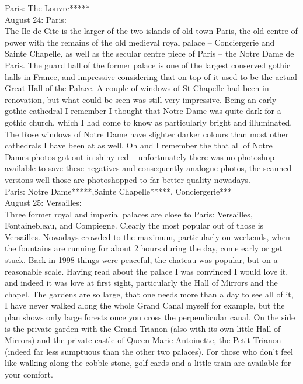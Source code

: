 Paris: The Louvre*****\\

August 24: Paris:\\
The Ile de Cite is the larger of the two islands of old town Paris, the old centre of power with the remains of the old medieval royal palace -- Conciergerie and Sainte Chapelle, as well as the secular centre piece of Paris -- the Notre Dame de Paris. The guard hall of the former palace is one of the largest conserved gothic halls in France, and impressive considering that on top of it used to be the actual Great Hall of the Palace. A couple of windows of St Chapelle had been in renovation, but what could be seen was still very impressive. Being an early gothic cathedral I remember I thought that Notre Dame was quite dark for a gothic church, which I had come to know as particularly bright and illuminated. The Rose windows of Notre Dame have slighter darker colours than most other cathedrals I have been at as well. Oh and I remember the that all of Notre Dames photos got out in shiny red -- unfortunately there was no photoshop available to save these negatives and consequently analogue photos, the scanned versions well those are photoshopped to far better quality nowadays.\\ 

Paris: Notre Dame*****,Sainte Chapelle*****, Conciergerie***\\

August 25: Versailles:\\
Three former royal and imperial palaces are close to Paris: Versailles, Fontainebleau, and Compiegne. Clearly the most popular out of those is Versailles. Nowadays crowded to the maximum, particularly on weekends, when the fountains are running for about 2 hours during the day, come early or get stuck. Back in 1998 things were peaceful, the chateau was popular, but on a reasonable scale. Having read about the palace I was convinced I would love it, and indeed it was love at first sight, particularly the Hall of Mirrors and the chapel. The gardens are so large, that one needs more than a day to see all of it, I have never walked along the whole Grand Canal myself for example, but the plan shows only large forests once you cross the perpendicular canal. On the side is the private garden with the Grand Trianon (also with its own little Hall of Mirrors) and the private castle of Queen Marie Antoinette, the Petit Trianon (indeed far less sumptuous than the other two palaces). For those who don't feel like walking along the cobble stone, golf cards and a little train are available for your comfort.\\

